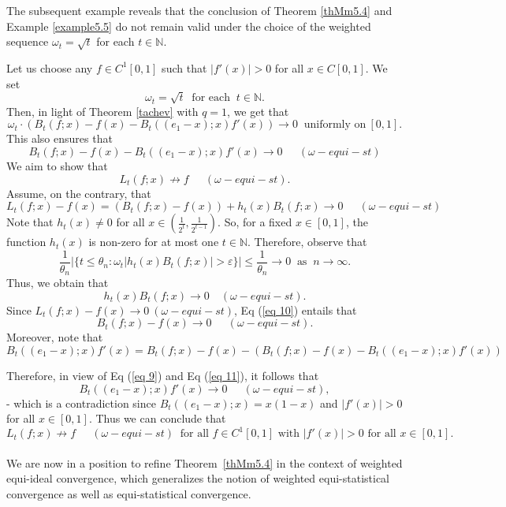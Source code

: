 \documentclass[reqno]{amsart}
\begin{document}
{The subsequent example reveals that the conclusion of  Theorem \ref{thMm5.4} and Example \ref{example5.5} do not remain valid under the choice of the weighted sequence $\omega_t=\sqrt{t}$ for each $t\in\mathbb{N}$. 
\begin{example}\label{exwrong}
Let us choose any $f\in C^1[0,1]$ such that $|f'(x)|>0$ for all $x\in C[0,1]$. We set 
$$
\omega_t=\sqrt{t}~\mbox{ for each }~t\in\mathbb{N}.
$$ 
Then, in light of Theorem \ref{tachev} with $q=1$, we get that 
$$
\omega_t\cdot \left( B_t(f; x) - f(x) - B_t((e_1-x);x)f'(x) \right) \to 0~\mbox{ uniformly on}~[0,1].
$$
This also ensures that 
\begin{equation}\label{eq 9}
	B_t(f; x) - f(x) -B_t((e_1-x);x)f'(x)\to 0~~\quad(\omega-equi-st)
\end{equation}
We aim to show that
$$
L_t(f;x)\not\to f~~\quad(\omega-equi-st).
$$
Assume, on the contrary, that 
\begin{equation}\label{eq 10}
L_t(f;x)-f(x)=(B_t(f;x)-f(x))+h_t(x)B_t(f;x)\to 0 ~~\quad(\omega-equi-st)
\end{equation}
Note that $h_t(x)\neq 0$ for all $x\in (\frac{1}{2^t},\frac{1}{2^{t-1}})$. 
So, for a fixed $x\in[0,1]$, the function $h_t(x)$ is non-zero for at most one $t\in \mathbb{N}$. Therefore, observe that 
$$
\frac{1}{\theta_n}|\{t\leq \theta _n:\omega_t|h_t(x)B_t(f;x)|>\varepsilon\}|\leq \frac{1}{\theta_n}\to 0 ~\mbox{ as }~n\to \infty.
$$
Thus, we obtain that 
 $$
 h_t(x)B_t(f;x)\to 0\quad(\omega-equi-st).
 $$
 Since $L_t(f;x)-f(x)\to 0 ~(\omega-equi-st)$, Eq (\ref{eq 10}) entails that 
 \begin{equation}\label{eq 11}
  B_t(f;x)-f(x)\to 0 ~~\quad(\omega-equi-st).
 \end{equation}
 Moreover, note that 
 $$
 B_t((e_1-x);x)f'(x)= B_t(f;x)-f(x)-\left( B_t(f; x) - f(x) -B_t((e_1-x);x)f'(x) \right)
 $$
\end{example} 
Therefore, in view of Eq (\ref{eq 9}) and Eq (\ref{eq 11}), it follows that 
$$
 B_t((e_1-x);x)f'(x)\to 0 ~~\quad(\omega-equi-st),
$$
- which is a contradiction since $B_t((e_1-x);x)=x(1-x)$ and  $|f'(x)|>0$ for all $x\in [0,1]$. Thus we can conclude that 
$$
L_t(f;x)\not\to f~~\quad(\omega-equi-st)~\mbox{ for all $f\in C^1[0,1]$ with $|f'(x)|>0$ for all $x\in [0,1]$}.
$$\\
We are now in a position to refine Theorem~\ref{thMm5.4} in the context of weighted equi-ideal convergence, which generalizes the notion of weighted equi-statistical convergence as well as equi-statistical convergence.
	\begin{theorem}	\label{korokvingequiideal}

\end{theorem}}
\end{document}
